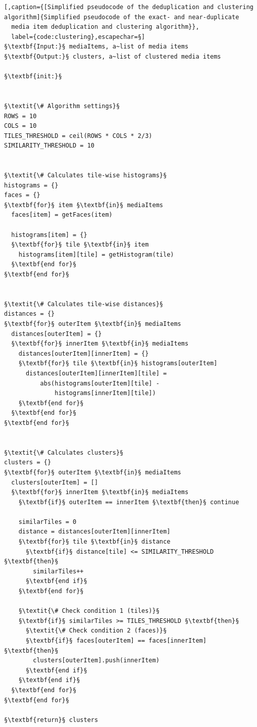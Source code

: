 \begin{lstlisting}[,caption={[Simplified pseudocode of the deduplication and clustering algorithm]{Simplified pseudocode of the exact- and near-duplicate
  media item deduplication and clustering algorithm}},
  label={code:clustering},escapechar=§]
§\textbf{Input:}§ mediaItems, a~list of media items
§\textbf{Output:}§ clusters, a~list of clustered media items

§\textbf{init:}§


§\textit{\# Algorithm settings}§
ROWS = 10
COLS = 10
TILES_THRESHOLD = ceil(ROWS * COLS * 2/3)
SIMILARITY_THRESHOLD = 10


§\textit{\# Calculates tile-wise histograms}§
histograms = {}
faces = {}
§\textbf{for}§ item §\textbf{in}§ mediaItems
  faces[item] = getFaces(item)
  
  histograms[item] = {}
  §\textbf{for}§ tile §\textbf{in}§ item
    histograms[item][tile] = getHistogram(tile)
  §\textbf{end for}§
§\textbf{end for}§  

    
§\textit{\# Calculates tile-wise distances}§
distances = {}
§\textbf{for}§ outerItem §\textbf{in}§ mediaItems
  distances[outerItem] = {}
  §\textbf{for}§ innerItem §\textbf{in}§ mediaItems
    distances[outerItem][innerItem] = {}
    §\textbf{for}§ tile §\textbf{in}§ histograms[outerItem]
      distances[outerItem][innerItem][tile] =
          abs(histograms[outerItem][tile] -
              histograms[innerItem][tile])
    §\textbf{end for}§
  §\textbf{end for}§
§\textbf{end for}§

  
§\textit{\# Calculates clusters}§
clusters = {}
§\textbf{for}§ outerItem §\textbf{in}§ mediaItems  
  clusters[outerItem] = []  
  §\textbf{for}§ innerItem §\textbf{in}§ mediaItems
    §\textbf{if}§ outerItem == innerItem §\textbf{then}§ continue
    
    similarTiles = 0
    distance = distances[outerItem][innerItem]
    §\textbf{for}§ tile §\textbf{in}§ distance      
      §\textbf{if}§ distance[tile] <= SIMILARITY_THRESHOLD §\textbf{then}§
        similarTiles++
      §\textbf{end if}§
    §\textbf{end for}§
         
    §\textit{\# Check condition 1 (tiles)}§
    §\textbf{if}§ similarTiles >= TILES_THRESHOLD §\textbf{then}§
      §\textit{\# Check condition 2 (faces)}§
      §\textbf{if}§ faces[outerItem] == faces[innerItem] §\textbf{then}§
        clusters[outerItem].push(innerItem)
      §\textbf{end if}§
    §\textbf{end if}§    
  §\textbf{end for}§
§\textbf{end for}§

§\textbf{return}§ clusters        
\end{lstlisting}


